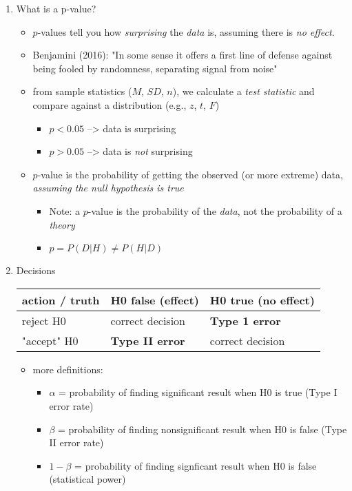 \documentclass{foils}
\begin{document}
\label{sec-2}
\begin{enumerate}
\item What is a p-value?
\label{sec-2-1}
\begin{itemize}
\item $p$-values tell you how \emph{surprising} the \emph{data} is, assuming there is \emph{no effect}.
\item Benjamini (2016): "In some sense it offers a first line of defense against being fooled by randomness, separating signal from noise"
\item from sample statistics ($M$, $SD$, $n$), we calculate a \emph{test statistic} and compare against a distribution (e.g., $z$, $t$, $F$)
\begin{itemize}
\item $p<0.05$ --> data is surprising
\item $p>0.05$ --> data is \emph{not} surprising
\end{itemize}
\item $p$-value is the probability of getting the observed (or more extreme) data, \emph{assuming the null hypothesis is true}
\begin{itemize}
\item Note: a $p$-value is the probability of the \emph{data}, not the probability of a \emph{theory}
\item $p = P(D|H) \neq P(H|D)$
\end{itemize}
\end{itemize}

\item Decisions
\label{sec-2-2}
\begin{center}
\begin{tabular}{lll}
action / truth & H0 false (effect) & H0 true (no effect)\\
\hline
reject H0 & correct decision & \textbf{Type 1 error}\\
"accept" H0 & \textbf{Type II error} & correct decision\\
\end{tabular}
\end{center}

\begin{itemize}
\item more definitions:
\begin{itemize}
\item $\alpha$ = probability of finding significant result when H0 is true (Type I error rate)
\item $\beta$ = probability of finding nonsignificant result when H0 is false (Type II error rate)
\item $1-\beta$ = probability of finding signficant result when H0 is false (statistical power)
\end{itemize}
\end{itemize}
\end{enumerate}
\end{document}
